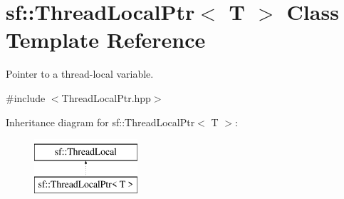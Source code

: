 \hypertarget{classsf_1_1_thread_local_ptr}{}\section{sf\+:\+:Thread\+Local\+Ptr$<$ T $>$ Class Template Reference}
\label{classsf_1_1_thread_local_ptr}


Pointer to a thread-\/local variable.  




{\ttfamily \#include $<$Thread\+Local\+Ptr.\+hpp$>$}

Inheritance diagram for sf\+:\+:Thread\+Local\+Ptr$<$ T $>$\+:\begin{figure}[H]
\begin{center}
\leavevmode
\includegraphics[height=2.000000cm]{classsf_1_1_thread_local_ptr}
\end{center}
\end{figure}
